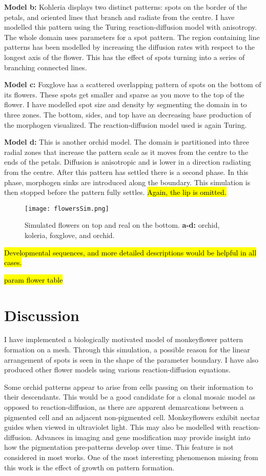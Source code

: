 \textbf{Model b:}
Kohleria displays two distinct patterns: spots on the border of the petals, and oriented lines that branch and radiate from the centre. I have modelled this pattern using the Turing reaction-diffusion model with anisotropy. The whole domain uses parameters for a spot pattern. The region containing line patterns has been modelled by increasing the diffusion rates with respect to the longest axis of the flower. This has the effect of spots turning into a series of branching connected lines.

\textbf{Model c:}
Foxglove has a scattered overlapping pattern of spots on the bottom of its flowers. These spots get smaller and sparse as you move to the top of the flower. I have modelled spot size and density by segmenting the domain in to three zones. The bottom, sides, and top have an decreasing base production of the morphogen visualized. The reaction-diffusion model used is again Turing.

\textbf{Model d:}
This is another orchid model. The domain is partitioned into three radial zones that increase the pattern scale as it moves from the centre to the ends of the petals. Diffusion is anisotropic and is lower in a direction radiating from the centre. After this pattern has settled there is a second phase. In this phase, morphogen sinks are introduced along the boundary. This simulation is then stopped before the pattern fully settles. \hl{Again, the lip is omitted.}

\begin{figure}[ht]
	\centering
	\texttt{[image: flowersSim.png]}
	\caption{Simulated flowers on top and real on the bottom. \textbf{a-d:} orchid, koleria, foxglove, and orchid.}
	\label{fig:orchids}
\end{figure}

\hl{Developmental sequences, and more detailed descriptions would be helpful in all cases.}

\hl{param flower table}

\section{Discussion}

I have implemented a biologically motivated model of monkeyflower pattern formation on a mesh. Through this simulation, a possible reason for the linear arrangement of spots is seen in the shape of the parameter boundary. I have also produced other flower models using various reaction-diffusion equations. 

Some orchid patterns appear to arise from cells passing on their information to their descendants. This would be a good candidate for a clonal mosaic \cite{korn2007} model as opposed to reaction-diffusion, as there are apparent demarcations between a pigmented cell and an adjacent non-pigmented cell. Monkeyflowers exhibit nectar guides when viewed in ultraviolet light. This may also be modelled with reaction-diffusion. Advances in imaging and gene modification may provide insight into how the pigmentation pre-patterns develop over time. This feature is not considered in most works. One of the most interesting phenomenon missing from this work is the effect of growth on pattern formation.